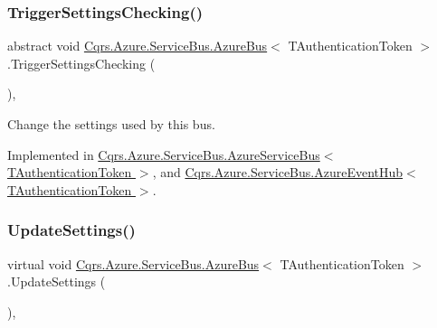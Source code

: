 \subsubsection{\texorpdfstring{Trigger\+Settings\+Checking()}{TriggerSettingsChecking()}}
{\footnotesize\ttfamily abstract void \hyperlink{classCqrs_1_1Azure_1_1ServiceBus_1_1AzureBus}{Cqrs.\+Azure.\+Service\+Bus.\+Azure\+Bus}$<$ T\+Authentication\+Token $>$.Trigger\+Settings\+Checking (\begin{DoxyParamCaption}{ }\end{DoxyParamCaption})\hspace{0.3cm}{\ttfamily [protected]}, {}}



Change the settings used by this bus. 



Implemented in \hyperlink{classCqrs_1_1Azure_1_1ServiceBus_1_1AzureServiceBus_ae4b736019e332a81eb08d3696f8b6e7e_ae4b736019e332a81eb08d3696f8b6e7e}{Cqrs.\+Azure.\+Service\+Bus.\+Azure\+Service\+Bus$<$ T\+Authentication\+Token $>$}, and \hyperlink{classCqrs_1_1Azure_1_1ServiceBus_1_1AzureEventHub_a779ce1115cf00dfaf072056a6ad8f9fe_a779ce1115cf00dfaf072056a6ad8f9fe}{Cqrs.\+Azure.\+Service\+Bus.\+Azure\+Event\+Hub$<$ T\+Authentication\+Token $>$}.

\mbox{\label{classCqrs_1_1Azure_1_1ServiceBus_1_1AzureBus_aa41ae78c1e674cfd9316c573ca5d1bab_aa41ae78c1e674cfd9316c573ca5d1bab}} 
\subsubsection{\texorpdfstring{Update\+Settings()}{UpdateSettings()}}
{\footnotesize\ttfamily virtual void \hyperlink{classCqrs_1_1Azure_1_1ServiceBus_1_1AzureBus}{Cqrs.\+Azure.\+Service\+Bus.\+Azure\+Bus}$<$ T\+Authentication\+Token $>$.Update\+Settings (\begin{DoxyParamCaption}{ }\end{DoxyParamCaption})\hspace{0.3cm}{\ttfamily [protected]}, {\ttfamily [virtual]}}



